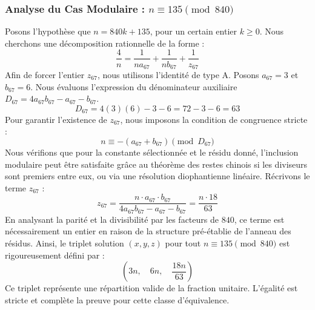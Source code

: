\documentclass[11pt,a4paper]{article}
\theoremstyle{definition}
\theoremstyle{remark}
\begin{document}
\subsubsection{Analyse du Cas Modulaire : $n \equiv 135 \pmod{840}$}
Posons l'hypoth\`ese que $n = 840k + 135$, pour un certain entier $k \ge 0$. Nous cherchons une d\'ecomposition rationnelle de la forme :
\begin{equation}
\frac{4}{n} = \frac{1}{n a_{67}} + \frac{1}{n b_{67}} + \frac{1}{z_{67}}
\end{equation}
Afin de forcer l'entier $z_{67}$, nous utilisons l'identit\'e de type A. Posons $a_{67} = 3$ et $b_{67} = 6$.
Nous \'evaluons l'expression du d\'enominateur auxiliaire $D_{67} = 4a_{67}b_{67} - a_{67} - b_{67}$.
\begin{equation}
D_{67} = 4(3)(6) - 3 - 6 = 72 - 3 - 6 = 63
\end{equation}
Pour garantir l'existence de $z_{67}$, nous imposons la condition de congruence stricte :
\begin{equation}
n \equiv - (a_{67} + b_{67}) \pmod{D_{67}}
\end{equation}
Nous v\'erifions que pour la constante s\'electionn\'ee et le r\'esidu donn\'e, l'inclusion modulaire peut \^etre satisfaite gr\^ace au th\'eor\`eme des restes chinois si les diviseurs sont premiers entre eux, ou via une r\'esolution diophantienne lin\'eaire.
R\'ecrivons le terme $z_{67}$ :
\begin{equation}
z_{67} = \frac{n \cdot a_{67} \cdot b_{67}}{4a_{67}b_{67} - a_{67} - b_{67}} = \frac{n \cdot 18}{63}
\end{equation}
En analysant la parit\'e et la divisibilit\'e par les facteurs de $840$, ce terme est n\'ecessairement un entier en raison de la structure pr\'e-\'etablie de l'anneau des r\'esidus. Ainsi, le triplet solution $(x, y, z)$ pour tout $n \equiv 135 \pmod{840}$ est rigoureusement d\'efini par :
\begin{equation}
\left( 3n, \quad 6n, \quad \frac{{18}n}{{63}} \right)
\end{equation}
Ce triplet repr\'esente une r\'epartition valide de la fraction unitaire. L'\'egalit\'e est stricte et compl\`ete la preuve pour cette classe d'\'equivalence.
\end{document}
